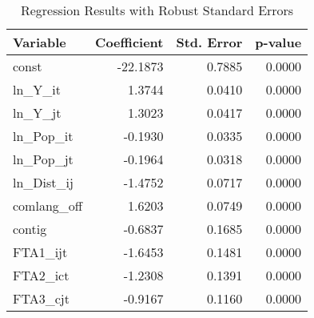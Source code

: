 \begin{table}[ht]
\centering
\begin{tabular}{|l|r|r|r|}
\hline
Variable & Coefficient & Std. Error & p-value \\ \hline
const & -22.1873 & 0.7885 & 0.0000 \\ \hline
ln_Y_it & 1.3744 & 0.0410 & 0.0000 \\ \hline
ln_Y_jt & 1.3023 & 0.0417 & 0.0000 \\ \hline
ln_Pop_it & -0.1930 & 0.0335 & 0.0000 \\ \hline
ln_Pop_jt & -0.1964 & 0.0318 & 0.0000 \\ \hline
ln_Dist_ij & -1.4752 & 0.0717 & 0.0000 \\ \hline
comlang_off & 1.6203 & 0.0749 & 0.0000 \\ \hline
contig & -0.6837 & 0.1685 & 0.0000 \\ \hline
FTA1_ijt & -1.6453 & 0.1481 & 0.0000 \\ \hline
FTA2_ict & -1.2308 & 0.1391 & 0.0000 \\ \hline
FTA3_cjt & -0.9167 & 0.1160 & 0.0000 \\ \hline
\end{tabular}
\caption{Regression Results with Robust Standard Errors}
\label{tab:regression_results}
\end{table}
